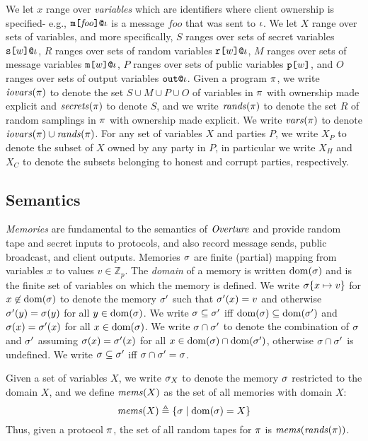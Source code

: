 We let $x$ range over \emph{variables} which are identifiers where
client ownership is specified- e.g.,
$\texttt{m[}\mathit{foo}\texttt{]}\texttt{@}\iota$ is a message $\mathit{foo}$ that
was sent to $\iota$. We let $X$ range over sets of variables, and more
specifically, $S$ ranges over sets of secret variables
$\texttt{s[}w\texttt{]}\texttt{@}\iota$, $R$ ranges over sets of random variables
$\texttt{r[}w\texttt{]}\texttt{@}\iota$, $M$ ranges over sets of message variables
$\texttt{m[}w\texttt{]}\texttt{@}\iota$, $P$ ranges over sets of public variables
$\texttt{p[}w\texttt{]}$, and $O$ ranges over sets of output variables $\texttt{out}\texttt{@}\iota$.
Given a program $\pi$, we write $\mathit{iovars}(\pi)$ to denote the set $S
\cup M \cup P \cup O$ of variables in $\pi$ with ownership made
explicit and $\mathit{secrets}(\pi)$ to denote $S$, and we write
$\mathit{rands}(\pi)$ to denote the set $R$ of random samplings in $\pi$
with ownership made explicit. We write $\mathit{vars}(\pi)$ to denote
$\mathit{iovars}(\pi) \cup \mathit{rands}(\pi)$. For any set of variables $X$ and
parties $P$, we write $X_P$ to denote the subset of $X$ owned by any
party in $P$, in particular we write $X_H$ and $X_C$ to denote the
subsets belonging to honest and corrupt parties, respectively.

\subsection{Semantics}

\emph{Memories} are fundamental to the semantics of $\mathit{Overture}$ and
provide random tape and secret inputs to protocols, and also record
message sends, public broadcast, and client outputs. Memories $\sigma$ are finite
(partial) mapping from variables $x$ to values $v \in \mathbb{Z}_p$. The \emph{domain} of a
memory is written $\mathrm{dom}(\sigma)$ and is the finite set of variables on
which the memory is defined. We write $\sigma\{ x \mapsto v\}$ for
$x\not\in\mathrm{dom}(\sigma)$ to denote the memory $\sigma'$ such that
$\sigma'(x) = v$ and otherwise $\sigma'(y) = \sigma(y)$ for all $y
\in \mathrm{dom}(\sigma)$. We write $\sigma \subseteq \sigma'$ iff
$\mathrm{dom}(\sigma) \subseteq \mathrm{dom}(\sigma')$ and $\sigma(x) =
\sigma'(x)$ for all $x \in \mathrm{dom}(\sigma)$. We write $\sigma \cap
\sigma'$ to denote the combination of $\sigma$ and $\sigma'$
assuming $\sigma(x) = \sigma'(x)$ for all $x \in \mathrm{dom}(\sigma)
\cap \mathrm{dom}(\sigma')$, otherwise $\sigma \cap \sigma'$ is undefined.
We write $\sigma \subseteq \sigma'$ iff $\sigma \cap \sigma'
= \sigma$.

Given a set of variables $X$, we write $\sigma_X$ to denote the
memory $\sigma$ restricted to the domain $X$, and we define
$\mathit{mems}(X)$ as the set of all memories with domain $X$:
$$
\mathit{mems}(X) \triangleq \{ \sigma \mid \mathrm{dom}(\sigma) = X \}
$$
Thus, given a protocol $\pi$, the set of all random tapes for
$\pi$ is $\mathit{mems}(\mathit{rands}(\pi))$.

